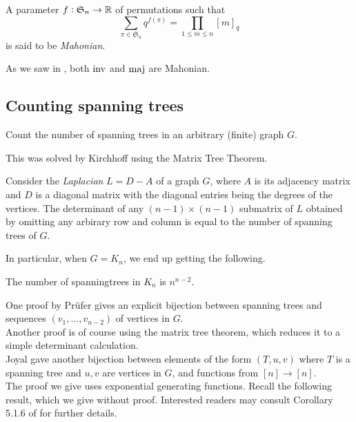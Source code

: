 	\begin{definition}
		A parameter $f : \mathfrak{S}_n \to \mathbb{R}$ of permutations such that
		\[ \sum_{\pi \in \mathfrak{S}_n} q^{f(\pi)} = \prod_{1 \le m \le n} [m]_q \]
		is said to be \emph{Mahonian}.
	\end{definition}

	As we saw in , both $\operatorname{inv}$ and $\operatorname{maj}$ are Mahonian.

\subsection{Counting spanning trees}

	\begin{problem*}
		Count the number of spanning trees in an arbitrary (finite) graph $G$.
	\end{problem*}

	This was solved by Kirchhoff using the Matrix Tree Theorem.
	
	\begin{ftheo}
		Consider the \emph{Laplacian} $L = D-A$ of a graph $G$, where $A$ is its adjacency matrix and $D$ is a diagonal matrix with the diagonal entries being the degrees of the vertices. The determinant of any $(n-1)\times(n-1)$ submatrix of $L$ obtained by omitting any arbirary row and column is equal to the number of spanning trees of $G$.
	\end{ftheo}


	In particular, when $G = K_n$, we end up getting the following.

	\begin{ftheo}
		\label{theo: cayleys theorem}
		The number of spanningtrees in $K_n$ is $n^{n-2}$.
	\end{ftheo}
	One proof by Pr\"{u}fer gives an explicit bijection between spanning trees and sequences $(v_1,\ldots,v_{n-2})$ of vertices in $G$.\\
	Another proof is of course using the matrix tree theorem, which reduces it to a simple determinant calculation.\\
	Joyal gave another bijection between elements of the form $(T,u,v)$ where $T$ is a spanning tree and $u,v$ are vertices in $G$, and functions from $[n] \to [n]$.\\

	The proof we give uses exponential generating functions. Recall the following result, which we give without proof. Interested readers may consult Corollary 5.1.6 of \cite{ec2} for further details.

